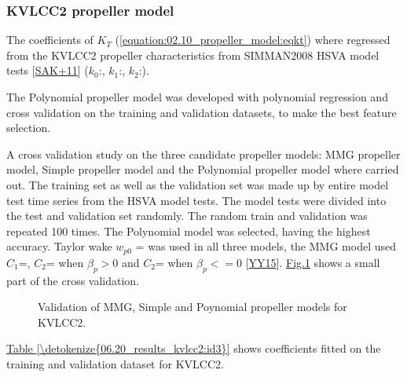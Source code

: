 \documentclass[review]{elsarticle}
\begin{document}
\subsubsection{KVLCC2 propeller model}
\label{\detokenize{06.20_results_kvlcc2:kvlcc2-propeller-model}}
\sphinxAtStartPar
The coefficients of \(K_T\) (\autoref{equation:02.10_propeller_model:eqkt}) where regressed from the KVLCC2 propeller characteristics from SIMMAN2008 HSVA model tests {[}\hyperlink{cite.bibligraphy:id79}{SAK+11}{]} (\(k_0\):, \(k_1\):, \(k_2\):).

\sphinxAtStartPar
The Polynomial propeller model was developed with polynomial regression and cross validation on the training and validation datasets, to make the best feature selection.

\sphinxAtStartPar
A cross validation study on the three candidate propeller models: MMG propeller model, Simple propeller model and the Polynomial propeller model where carried out. The training set as well as the validation set was made up by entire model test time series from the HSVA model tests.
The model tests were divided into the test and validation set randomly. The random train and validation was repeated 100 times. The Polynomial model was selected, having the highest accuracy. Taylor wake \(w_{p0}\) =  was used in all three models, the MMG model used \(C_1\)=, \(C_2\)= when \(\beta_p>0\) and \(C_2\)= when \(\beta_p<=0\) {[}\hyperlink{cite.bibligraphy:id22}{YY15}{]}. \hyperref[\detokenize{06.20_results_kvlcc2:fig-propeller-validation}]{Fig.\@ \ref{\detokenize{06.20_results_kvlcc2:fig-propeller-validation}}} shows a small part of the cross validation.

\begin{figure}[H]
\centering
\capstart

\noindent{}
\caption{Validation of MMG, Simple and Poynomial propeller models for KVLCC2.}\label{\detokenize{06.20_results_kvlcc2:fig-propeller-validation}}\end{figure}

\sphinxAtStartPar
\hyperref[\detokenize{06.20_results_kvlcc2:id3}]{Table \ref{\detokenize{06.20_results_kvlcc2:id3}}} shows coefficients fitted on the training and validation dataset for KVLCC2.
\end{document}
